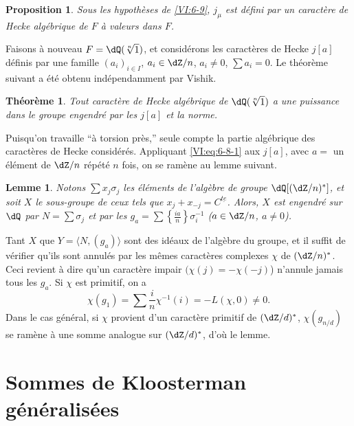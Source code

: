 \documentclass[oneside]{book}
\theoremstyle{sga-source}
\theoremstyle{sga-source-dash}
\theoremstyle{sga-source-dotdash}
\theoremstyle{sga-source-number-note-dash}
\theoremstyle{sga-source-note-number-dotdash}
\theoremstyle{sga-source-example-dotdash}
\theoremstyle{sga-source-inline-number}
\theoremstyle{sga-source-bare-number}
\theoremstyle{sga-source}
\newtheorem{lemma_}[subsection]{Lemme}
\newtheorem{theorem_}[subsection]{Théorème}
\newtheorem{proposition_}[subsection]{Proposition}
\newcommand{\PrintPage}[1]{}\newcommand{\MathPage}[1]{}\newcommand{\PrintCite}[2]{#1}\newcommand{\var}[3]{#2}
\begin{document}
\begin{proposition_}\label{VI:6-10}
Sous les hypothèses de \ref{VI:6-9}, $j_\mu$ est défini par un caractère 
de Hecke algébrique de $F$ à valeurs dans $F$. 
\end{proposition_}

Faisons à nouveau $F=\dQ(\sqrt[n]{1})$, et considérons les caractères de 
Hecke $j[a]$ définis par une famille $(a_i)_{i\in I}$, $a_i\in \dZ/n$, 
$a_i\ne 0$, $\sum a_i=0$. Le théorème suivant a été obtenu 
indépendamment par Vishik. 





\begin{theorem_}\label{VI:6-11}
Tout caractère de Hecke algébrique de $\dQ(\sqrt[n]{1})$ a une puissance 
dans le groupe engendré par les $j[a]$ et la norme. 
\end{theorem_}

Puisqu'on travaille ``à torsion près,'' seule compte la partie algébrique 
des caractères de Hecke considérés. Appliquant \eqref{VI:eq:6-8-1} aux 
$j[a]$, avec $a=$ un élément de $\dZ/n$ répété $n$ fois, on se 
ramène au lemme suivant.





\begin{lemma_}\label{VI:6-12}
Notons $\sum x_j \sigma_j$ les éléments de l'algèbre de groupe 
$\dQ[(\dZ/n)^\ast]$, et soit $X$ le sous-groupe de ceux tels que 
$x_j+x_{-j}=C^{\underline{t e}}$. Alors, $X$ est engendré sur $\dQ$ par 
$N=\sum \sigma_j$ et par les 
$g_a=\sum \left\{ \frac{i a}{n}\right\} \sigma_i^{-1}$ 
($a\in \dZ/n$, $a\ne 0$). 
\end{lemma_}

\PrintPage{218}
Tant $X$ que $Y=\langle N,(g_a)\rangle$ sont des idéaux de l'algèbre du 
groupe, et il suffit de vérifier qu'ils sont annulés par les mêmes 
caractères complexes $\chi$ de $(\dZ/n)^\ast$. Ceci revient à dire qu'un 
caractère impair $(\chi(j)=-\chi(-j)$) n'annule jamais tous les $g_a$. Si 
$\chi$ est primitif, on a 
\[
  \chi(g_1) = \sum \frac i n \chi^{-1}(i) = -L(\chi,0)\ne 0 \text{.} 
\]
Dans le cas général, si $\chi$ provient d'un caractère primitif de 
$(\dZ/d)^\ast$, $\chi(g_{n/d})$ se ramène à une somme analogue sur 
$(\dZ/d)^\ast$, d'où le lemme. 










\PrintPage{219}
\section{Sommes de Kloosterman généralisées}\label{VI:7}
\end{document}
